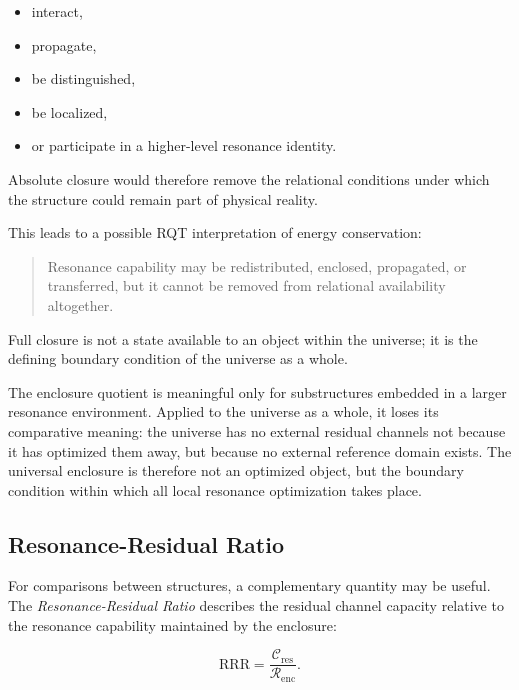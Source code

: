 \documentclass[11pt,a4paper]{article}
\begin{document}
\begin{itemize}
    \item interact,
    \item propagate,
    \item be distinguished,
    \item be localized,
    \item or participate in a higher-level resonance identity.
\end{itemize}

Absolute closure would therefore remove the relational conditions under which the structure could remain part of physical reality.

This leads to a possible RQT interpretation of energy conservation:

\begin{quote}
Resonance capability may be redistributed, enclosed, propagated, or transferred, but it cannot be removed from relational availability altogether.
\end{quote}


Full closure is not a state available to an object within the universe; it is the defining boundary condition of the universe as a whole.

The enclosure quotient is meaningful only for substructures embedded in a larger resonance environment. Applied to the universe as a whole, it loses its comparative meaning: the universe has no external residual channels not because it has optimized them away, but because no external reference domain exists. The universal enclosure is therefore not an optimized object, but the boundary condition within which all local resonance optimization takes place.



\subsection{Resonance-Residual Ratio}
\label{sec:resonance_residual_ratio}

For comparisons between structures, a complementary quantity may be useful. The \emph{Resonance-Residual Ratio} describes the residual channel capacity relative to the resonance capability maintained by the enclosure:

\begin{equation}
    \mathrm{RRR}
    =
    \frac{\mathcal{C}_{\mathrm{res}}}
         {\mathcal{R}_{\mathrm{enc}}}.
    \label{eq:resonance_residual_ratio}
\end{equation}
\end{document}

